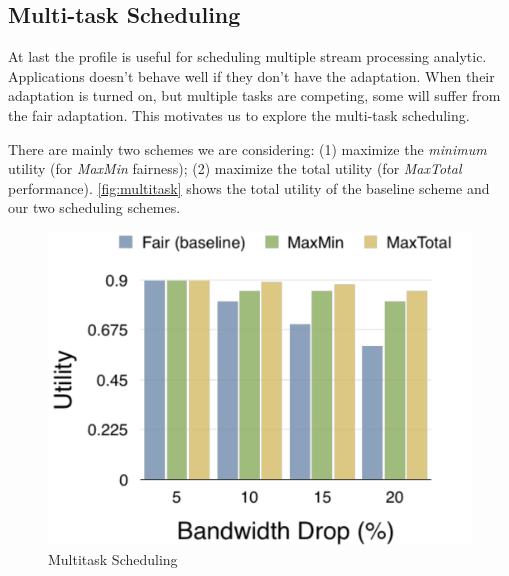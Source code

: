 \subsection{Multi-task Scheduling}
\label{sec:multi-task-sched}

At last the profile is useful for scheduling multiple stream processing
analytic. Applications doesn't behave well if they don't have the
adaptation. When their adaptation is turned on, but multiple tasks are
competing, some will suffer from the fair adaptation. This motivates us to
explore the multi-task scheduling.

There are mainly two schemes we are considering: (1) maximize the
\textit{minimum} utility (for \textit{MaxMin} fairness); (2) maximize the total
utility (for \textit{MaxTotal} performance). \autoref{fig:multitask} shows the
total utility of the baseline scheme and our two scheduling schemes.

\begin{figure}
  \centering
  \includegraphics[width=\columnwidth]{figures/multitask.pdf}
  \caption{Multitask Scheduling}
  \label{fig:multitask}
\end{figure}

